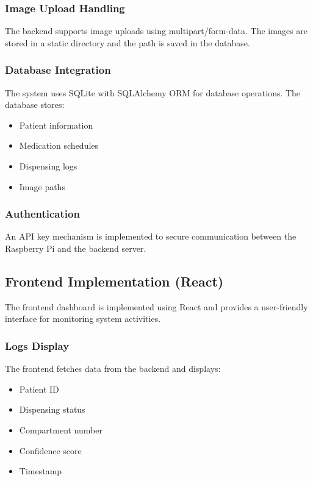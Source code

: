 \subsubsection{Image Upload Handling}

The backend supports image uploads using multipart/form-data. The images are stored in a static directory and the path is saved in the database.

\subsubsection{Database Integration}

The system uses SQLite with SQLAlchemy ORM for database operations. The database stores:

\begin{itemize}
    \item Patient information
    \item Medication schedules
    \item Dispensing logs
    \item Image paths
\end{itemize}

\subsubsection{Authentication}

An API key mechanism is implemented to secure communication between the Raspberry Pi and the backend server.

\subsection{Frontend Implementation (React)}

The frontend dashboard is implemented using React and provides a user-friendly interface for monitoring system activities.

\subsubsection{Logs Display}

The frontend fetches data from the backend and displays:

\begin{itemize}
    \item Patient ID
    \item Dispensing status
    \item Compartment number
    \item Confidence score
    \item Timestamp
\end{itemize}

